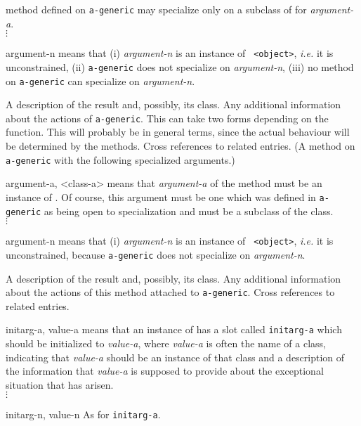 \begin{optDefinition}
\begin{genericargs}
    method defined on {\tt a-generic} may
    specialize only on a subclass of {\tt <class-a>} for {\em argument-a}.\\
    $\vdots$
    \item[argument-n] means that (i) {\em argument-n} is an instance of {\tt
        <object>}, {\em i.e.} it is unconstrained, (ii) {\tt a-generic} does not
    specialize on {\em argument-n}, (iii) no method on {\tt a-generic} can
    specialize on {\em argument-n}.
\end{genericargs}
%
\result%
A description of the result and, possibly, its class.
%
\remarks%
Any additional information about the actions of {\tt a-generic}.  This
can take two forms depending on the function.  This will probably be
in general terms, since the actual behaviour will be determined by the
methods.
%
\seealso%
Cross references to related entries.
%
%
(A method on {\tt a-generic} with the following specialized arguments.)
%
\begin{specargs}
    \item[argument-a, <class-a>] means that {\em argument-a} of the method must
    be an instance of {\tt <class-a>}.  Of course, this argument must be one
    which was defined in {\tt a-generic} as being open to
    specialization and {\tt <class-a>} must be a subclass of the class.\\
    $\vdots$
    \item[argument-n] means that (i) {\em argument-n} is an instance of {\tt
        <object>}, {\em i.e.} it is unconstrained, because {\tt a-generic} does
    not specialize on {\em argument-n}.
\end{specargs}
%
\result%
A description of the result and, possibly, its class.
%
\remarks%
Any additional information about the actions of this method attached
to {\tt a-generic}.
%
\seealso%
Cross references to related entries.
%
%
\begin{initoptions}
    \item[initarg-a, value-a] means that an instance of {\tt <a-condition>} has
    a slot called {\tt initarg-a} which should be initialized to {\em value-a},
    where {\em value-a} is often the name of a class, indicating that {\em
        value-a} should be an instance of that class and a description of the
    information that {\em value-a} is
    supposed to provide about the exceptional situation that has arisen.\\
    $\vdots$
    \item[initarg-n, value-n] As for {\tt initarg-a}.

\end{initoptions}
\end{optDefinition}
